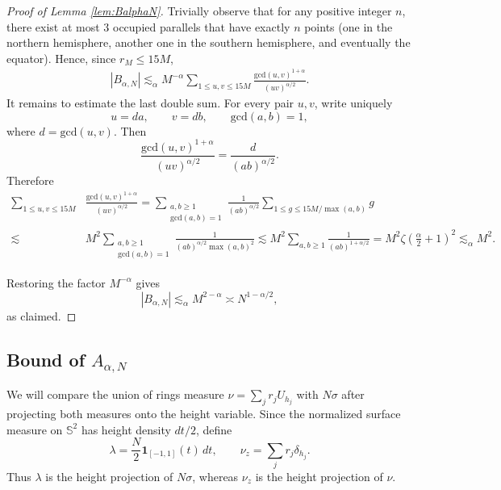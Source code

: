 \documentclass[11pt]{amsart}
\begin{document}
\begin{proof}[Proof of Lemma \ref{lem:BalphaN}]
Trivially observe that for any positive integer $n$, there exist at most $3$ occupied parallels that have exactly $n$ points (one in the northern hemisphere, another one in the southern hemisphere, and eventually the equator). Hence, since $r_M\leq 15M$,
\begin{align*}
    |B_{\alpha,N}|
    \lesssim_\alpha
    M^{-\alpha}
    \sum_{1\leq u,v\leq 15M}
    \frac{\mathrm{gcd}(u,v)^{1+\alpha}}
         {(uv)^{\alpha/2}}.
\end{align*}
It remains to estimate the last double sum. For every pair $u,v$, write
uniquely
\[
    u=da,\qquad v=db,\qquad \mathrm{gcd}(a,b)=1,
\]
where $d=\mathrm{gcd}(u,v)$. Then
\[
    \frac{\mathrm{gcd}(u,v)^{1+\alpha}}{(uv)^{\alpha/2}}
    =
    \frac{d}{(ab)^{\alpha/2}}.
\]
Therefore
\begin{align*}
    \sum_{1\leq u,v\leq 15M} &
    \frac{\mathrm{gcd}(u,v)^{1+\alpha}}{(uv)^{\alpha/2}}
    =
    \sum_{\substack{a,b\geq1\\\mathrm{gcd}(a,b)=1}}
    \frac{1}{(ab)^{\alpha/2}}
    \sum_{1\leq g\leq 15M/\max(a,b)}g
    \\
    \lesssim & M^2 \sum_{\substack{a,b\geq1\\\mathrm{gcd}(a,b)=1}}
    \frac{1}{(ab)^{\alpha/2}\max(a,b)^2}
    \lesssim M^2\sum_{a,b\geq1}
    \frac{1}{(ab)^{1+\alpha/2}}
    =M^2\zeta\left(\frac{\alpha}{2}+1\right)^2
    \lesssim_\alpha M^2.
\end{align*}

Restoring the factor $M^{-\alpha}$ gives
\[
    |B_{\alpha,N}|
    \lesssim_\alpha M^{2-\alpha}\asymp N^{1-\alpha/2},
\]
as claimed.

\end{proof}




\subsection{Bound of $A_{\alpha,N}$}

We will compare the union of rings measure $\nu=\sum_j r_jU_{h_j}$ with $N\sigma$  after projecting both
measures onto the height variable. Since the normalized surface measure on
$\mathbb S^2$ has height density $dt/2$, define
\[
 \lambda=\frac N2\mathbf 1_{[-1,1]}(t)\,dt,
 \qquad
 \nu_z=\sum_j r_j\delta_{h_j}.
\]
Thus $\lambda$ is the height projection of $N\sigma$, whereas $\nu_z$ is the
height projection of $\nu$.
\end{document}
